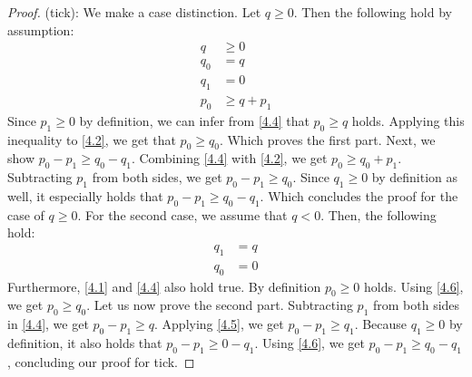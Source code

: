 \begin{proof}
   (tick): We make a case distinction. Let \(q \geq 0\). Then the following hold by assumption:
   \begin{align}
      q     &\geq 0 \label{4.1}\\
      q_0   &= q \label{4.2}\\
      q_1   &= 0 \label{4.3}\\
      p_0   &\geq q + p_1 \label{4.4}
   \end{align}
   Since \(p_1 \geq 0\) by definition, we can infer from \ref{4.4} that \(p_0 \geq q\) holds. Applying this inequality to \ref{4.2}, we get that \(p_0 \geq q_0\). Which proves the first part.
   Next, we show \(p_0 - p_1 \geq q_0 - q_1\). Combining \ref{4.4} with \ref{4.2}, we get \(p_0 \geq q_0 + p_1\). Subtracting \(p_1\) from both sides, we get \(p_0 - p_1 \geq q_0\). Since \(q_1 \geq 0\) by definition as well, it especially holds that \(p_0 - p_1 \geq q_0 - q_1\). Which concludes the proof for the case of \(q \geq 0\).
   For the second case, we assume that \(q < 0\). Then, the following hold:
   \begin{align}
      q_1   &= q \label{4.5}\\
      q_0   &= 0 \label{4.6}
   \end{align}
   Furthermore, \ref{4.1} and \ref{4.4} also hold true. By definition \(p_0 \geq 0\) holds. Using \ref{4.6}, we get \(p_0 \geq q_0\). 
   Let us now prove the second part. Subtracting \(p_1\) from both sides in \ref{4.4}, we get \(p_0 - p_1 \geq q \). Applying \ref{4.5}, we get \(p_0 - p_1 \geq q_1\). Because \(q_1 \geq 0\) by definition, it also holds that \(p_0 - p_1 \geq 0 - q_1\). Using \ref{4.6}, we get \(p_0 - p_1 \geq q_0 - q_1\), concluding our proof for tick.
      

\end{proof}
